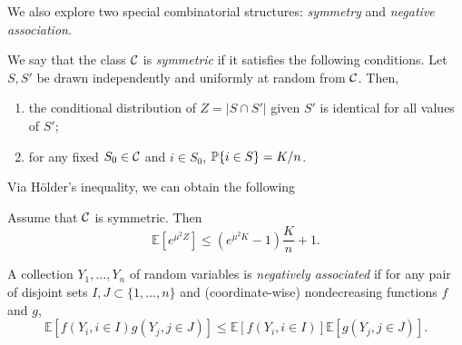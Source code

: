 \documentclass[10pt, oneside]{article}
\begin{document}
We also explore two special combinatorial structures: \textit{symmetry} and \textit{negative association}.
\begin{defn}[Symmetry]
  We say that the class ${\mathcal C}$ is {\it symmetric} if it satisfies the following conditions.
  Let $S,S'$ be drawn independently and uniformly at random from ${\mathcal C}$. Then,
  \begin{enumerate}
    \item the conditional distribution of $Z=|S\cap S'|$ given $S'$ is identical
    for all values of $S'$;
    \item for any fixed $S_0\in{\mathcal C}$ and $i\in S_0$, $\mathbb{P}\{i\in S\}=K/n$.
  \end{enumerate}
\end{defn}
Via H\"older's inequality, we can obtain the following
\begin{prop}
  \label{symmetric}
  Assume that ${\mathcal C}$ is symmetric. Then 
  $$\mathbb{E}[ e^{\mu^2 Z}]\le (e^{\mu^2K} -1 ) \frac{K}{n} +1.$$
\end{prop}
\begin{defn}
  A collection $Y_1,\ldots,Y_n$ of random variables is \textit{negatively associated} if for any pair of disjoint sets $I,J\subset\{1,\ldots,n\}$ and (coordinate-wise) nondecreasing functions $f$ and $g$,
\[
\mathbb{E}[ f(Y_i, i\in I) g(Y_j, j\in J) ]
\le\mathbb{E}[ f(Y_i, i\in I) ] \mathbb{E}[g(Y_j, j\in J) ].
\]
\end{defn}
\end{document}
